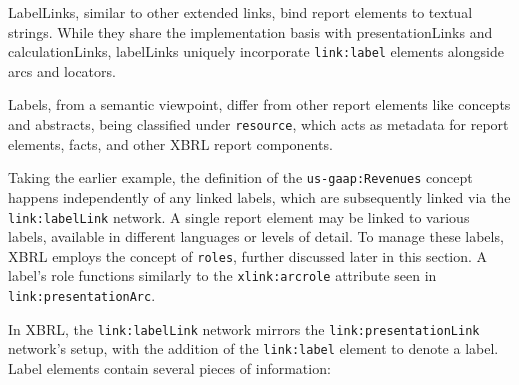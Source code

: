 
LabelLinks, similar to other extended links, bind report elements to textual strings.
While they share the implementation basis with presentationLinks and calculationLinks, labelLinks uniquely incorporate \texttt{link:label} elements alongside arcs and locators.

Labels, from a semantic viewpoint, differ from other report elements like concepts and abstracts,
being classified under \texttt{resource}, which acts as metadata for report elements, facts, and other XBRL report components.

Taking the earlier example, the definition of the \texttt{us-gaap:Revenues} concept happens independently of any linked labels,
which are subsequently linked via the \texttt{link:labelLink} network.
A single report element may be linked to various labels, available in different languages or levels of detail.
To manage these labels, XBRL employs the concept of \texttt{roles}, further discussed later in this section.
A label's role functions similarly to the \texttt{xlink:arcrole} attribute seen in \texttt{link:presentationArc}.

In XBRL, the \texttt{link:labelLink} network mirrors the \texttt{link:presentationLink} network's setup,
with the addition of the \texttt{link:label} element to denote a label.
Label elements contain several pieces of information:


